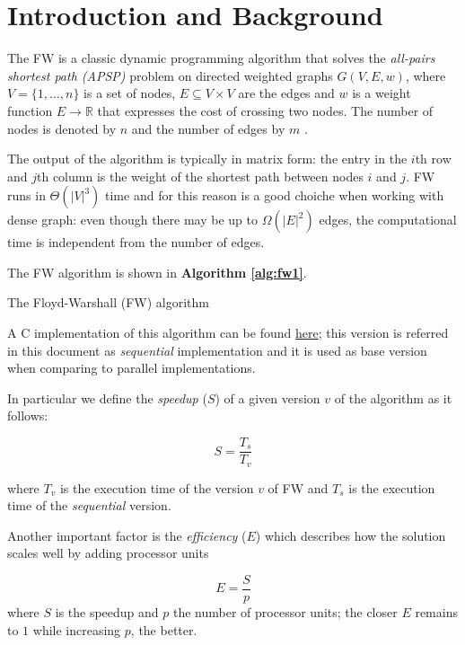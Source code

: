 \section{Introduction and Background}
The FW is a classic dynamic programming algorithm that solves the \emph{all-pairs shortest path (APSP)} problem on directed weighted
graphs $G(V, E, w)$, where $V = \{1, \dots, n\}$ is a set of nodes, $E \subseteq V \times V$ are the edges and $w$ is a weight function $E \rightarrow  \mathbb{R}$
that expresses the cost of crossing two nodes. The number of nodes is denoted by $n$ and the number of edges by $m$ . \par
The output of the algorithm is typically in matrix form: the entry in the $i$th row and $j$th column is the weight of the shortest path between
nodes $i$ and $j$. FW runs in $\Theta(|V|^3)$ time and for this reason is a good choiche when working with dense graph: even though there
may be up to $\Omega(|E|^2)$ edges, the computational time is independent from the number of edges. \par
The FW algorithm is shown in \textbf{Algorithm \ref*{alg:fw1}}.

\begin{algorithm}[h!]

\SetAlgoLined

 
\caption{The Floyd-Warshall (FW) algorithm}\label{alg:fw1}
\end{algorithm}

A C implementation of this algorithm can be found \href{https://github.com/firaja/Parallel-FloydWarshall/blob/master/sequential.c}{here};
this version is referred in this document as \emph{sequential} implementation and it is used as base version when comparing to parallel implementations. \par \par



In particular we define the \emph{speedup} ($S$) of a given version $v$ of the algorithm as it follows:

\[S = \frac{T_{s}}{T_{v}}\]

where $T_v$ is the execution time of the version $v$ of FW and $T_s$ is the execution time of the \emph{sequential} version. \par
Another important factor is the \emph{efficiency} ($E$) which describes how the solution scales well by adding processor units

\[E = \frac{S}{p}\]
where $S$ is the speedup and $p$ the number of processor units; the closer $E$ remains to $1$ while increasing $p$, the better.
